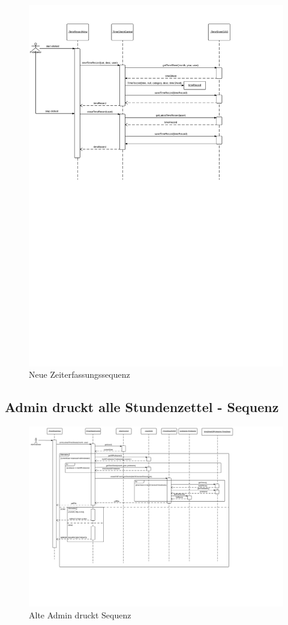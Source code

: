     \begin{figure}
      \centering
        \includegraphics[width=\linewidth]{new-Time-record-new.svg}
       \caption{Neue Zeiterfassungssequenz}
    \end{figure}

\subsection{Admin druckt alle Stundenzettel - Sequenz}
    \begin{figure}
      \centering
        \includegraphics[width=\linewidth]{Admin-prints-all-timesheets.svg}
       \caption{Alte Admin druckt Sequenz}
    \end{figure}

